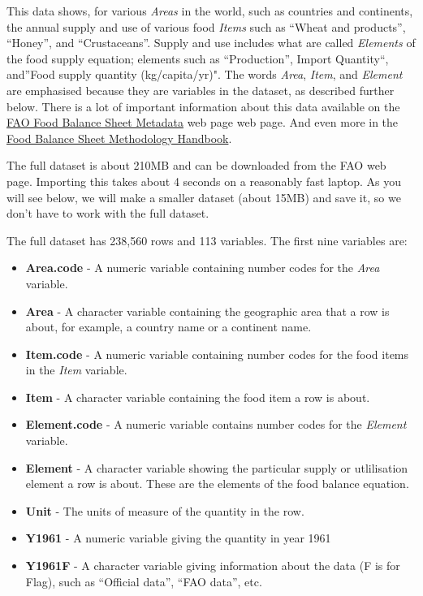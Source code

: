 \documentclass[]{book}
\providecommand{\tightlist}{%
  \setlength{\itemsep}{0pt}\setlength{\parskip}{0pt}}
\begin{document}
This data shows, for various \emph{Areas} in the world, such as countries and continents, the annual supply and use of various food \emph{Items} such as ``Wheat and products'', ``Honey'', and ``Crustaceans''. Supply and use includes what are called \emph{Elements} of the food supply equation; elements such as ``Production'', Import Quantity``, and''Food supply quantity (kg/capita/yr)". The words \emph{Area}, \emph{Item}, and \emph{Element} are emphasised because they are variables in the dataset, as described further below. There is a lot of important information about this data available on the \href{http://www.fao.org/faostat/en/\#data/FBS/metadata}{FAO Food Balance Sheet Metadata} web page web page. And even more in the \href{http://www.fao.org/economic/ess/fbs/ess-fbs02/en/}{Food Balance Sheet Methodology Handbook}.

The full dataset is about 210MB and can be downloaded from the FAO web page. Importing this takes about 4 seconds on a reasonably fast laptop. As you will see below, we will make a smaller dataset (about 15MB) and save it, so we don't have to work with the full dataset.

The full dataset has 238,560 rows and 113 variables. The first nine variables are:

\begin{itemize}
\tightlist
\item
  \textbf{Area.code} - A numeric variable containing number codes for the \emph{Area} variable.
\item
  \textbf{Area} - A character variable containing the geographic area that a row is about, for example, a country name or a continent name.
\item
  \textbf{Item.code} - A numeric variable containing number codes for the food items in the \emph{Item} variable.
\item
  \textbf{Item} - A character variable containing the food item a row is about.
\item
  \textbf{Element.code} - A numeric variable contains number codes for the \emph{Element} variable.
\item
  \textbf{Element} - A character variable showing the particular supply or utlilisation element a row is about. These are the elements of the food balance equation.
\item
  \textbf{Unit} - The units of measure of the quantity in the row.
\item
  \textbf{Y1961} - A numeric variable giving the quantity in year 1961
\item
  \textbf{Y1961F} - A character variable giving information about the data (F is for Flag), such as ``Official data'', ``FAO data'', etc.
\end{itemize}
\end{document}
